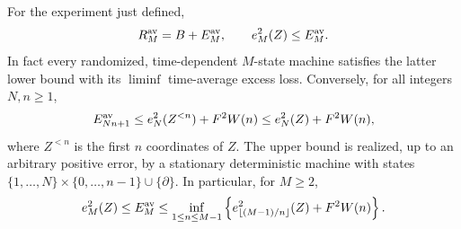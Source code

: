 \begin{theorem}\label{thm:v4-orbit}
For the experiment just defined,
\begin{equation}
 R_M^{\rm av}=B+E_M^{\rm av},\qquad
 e_M^2(Z)\le E_M^{\rm av}.                                      \label{eq:v4-orbit-lower}
\end{equation}
In fact every randomized, time-dependent $M$-state machine satisfies
the latter lower bound with its $\liminf$ time-average excess loss.
Conversely, for all integers $N,n\ge1$,
\begin{equation}
 E_{Nn+1}^{\rm av}
 \le e_N^2(Z^{<n})+F^2W(n)
 \le e_N^2(Z)+F^2W(n),                                          \label{eq:v4-orbit-upper}
\end{equation}
where $Z^{<n}$ is the first $n$ coordinates of $Z$.
The upper bound is realized, up to an arbitrary positive error, by a
stationary deterministic machine with states
$\{1,\ldots,N\}\times\{0,\ldots,n-1\}\cup\{\partial\}$.
In particular, for $M\ge2$,
\begin{equation}
 e_M^2(Z)\le E_M^{\rm av}
 \le\inf_{1\le n\le M-1}
 \left\{e_{\lfloor(M-1)/n\rfloor}^2(Z)+F^2W(n)\right\}.          \label{eq:v4-orbit-sandwich}
\end{equation}
\end{theorem}
